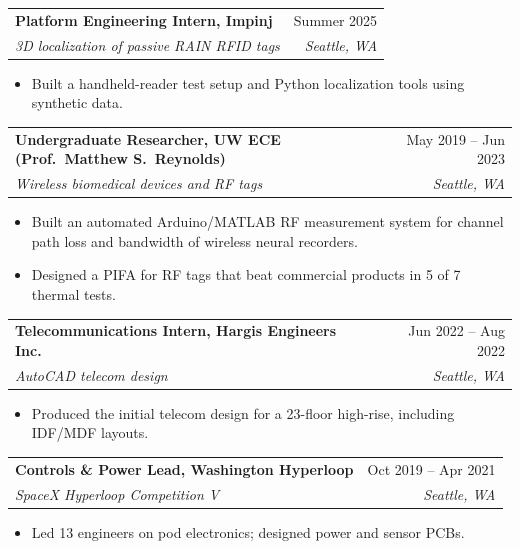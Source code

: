 \documentclass[10pt,letterpaper]{article}
\makeatletter
\newcommand{\entry}[4]{%
  \begin{tabularx}{\linewidth}{@{}X r@{}}
    \textbf{#1} & #2\\[-1pt]
    \textit{#3} & \textit{#4}
  \end{tabularx}\par}
\makeatother
\begin{document}
\entry{Platform Engineering Intern, Impinj}{Summer 2025}{3D localization of passive RAIN RFID tags}{Seattle, WA}
\begin{itemize}
  \item Built a handheld-reader test setup and Python localization tools using synthetic data.
\end{itemize}

\entry{Undergraduate Researcher, UW ECE (Prof.\ Matthew S.\ Reynolds)}{May 2019 -- Jun 2023}{Wireless biomedical devices and RF tags}{Seattle, WA}
\begin{itemize}
  \item Built an automated Arduino/MATLAB RF measurement system for channel path loss and bandwidth of wireless neural recorders.
  \item Designed a PIFA for RF tags that beat commercial products in 5 of 7 thermal tests.
\end{itemize}

\entry{Telecommunications Intern, Hargis Engineers Inc.}{Jun 2022 -- Aug 2022}{AutoCAD telecom design}{Seattle, WA}
\begin{itemize}
  \item Produced the initial telecom design for a 23-floor high-rise, including IDF/MDF layouts.
\end{itemize}

\entry{Controls \& Power Lead, Washington Hyperloop}{Oct 2019 -- Apr 2021}{SpaceX Hyperloop Competition V}{Seattle, WA}
\begin{itemize}
  \item Led 13 engineers on pod electronics; designed power and sensor PCBs.
\end{itemize}
\end{document}
